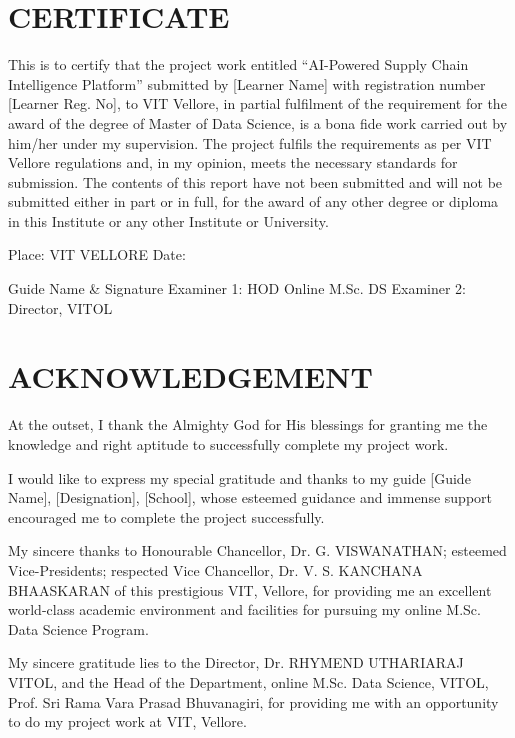 \documentclass[12pt, a4paper]{report}
\begin{document}
\chapter*{CERTIFICATE}
This is to certify that the project work entitled ``AI-Powered Supply Chain Intelligence Platform'' submitted by [Learner Name] with registration number [Learner Reg. No], to VIT Vellore, in partial fulfilment of the requirement for the award of the degree of Master of Data Science, is a bona fide work carried out by him/her under my supervision. The project fulfils the requirements as per VIT Vellore regulations and, in my opinion, meets the necessary standards for submission. The contents of this report have not been submitted and will not be submitted either in part or in full, for the award of any other degree or diploma in this Institute or any other Institute or University.

\vspace{0.5in}
\noindent Place: VIT VELLORE \newline
Date: \newline

\vspace{0.5in}
\noindent Guide Name \& Signature \newline
Examiner 1: HOD Online M.Sc. DS \newline
Examiner 2: Director, VITOL

\chapter*{ACKNOWLEDGEMENT}
At the outset, I thank the Almighty God for His blessings for granting me the knowledge and right aptitude to successfully complete my project work.

I would like to express my special gratitude and thanks to my guide [Guide Name], [Designation], [School], whose esteemed guidance and immense support encouraged me to complete the project successfully.

My sincere thanks to Honourable Chancellor, Dr. G. VISWANATHAN; esteemed Vice-Presidents; respected Vice Chancellor, Dr. V. S. KANCHANA BHAASKARAN of this prestigious VIT, Vellore, for providing me an excellent world-class academic environment and facilities for pursuing my online M.Sc. Data Science Program.

My sincere gratitude lies to the Director, Dr. RHYMEND UTHARIARAJ VITOL, and the Head of the Department, online M.Sc. Data Science, VITOL, Prof. Sri Rama Vara Prasad Bhuvanagiri, for providing me with an opportunity to do my project work at VIT, Vellore.
\end{document}

